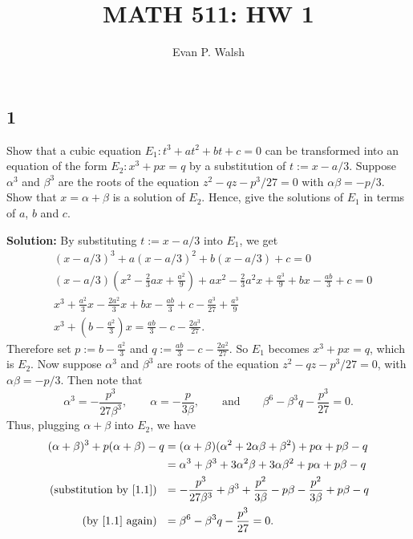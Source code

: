 \documentclass[12pt]{article}
\title{MATH 511: HW 1}
\author{Evan P. Walsh}
\begin{document}
\maketitle


\subsection*{1}
Show that a cubic equation $E_{1} : t^{3} + at^{2} + bt + c = 0$ can be transformed into an equation of the form $E_{2} : x^{3} + px = q$ by a
substitution of $t := x - a/3$. Suppose $\alpha^{3}$ and $\beta^{3}$ are the roots of the equation $z^{2} - qz - p^{3}/27 = 0$ with $\alpha\beta =
-p/3$. Show that $x = \alpha + \beta$ is a solution of $E_{2}$. Hence, give the solutions of $E_{1}$ in terms of $a$, $b$ and $c$.

{\bf Solution:} By substituting $t := x - a/3$ into $E_{1}$, we get 
\begin{align*}
& (x - a/3)^{3} + a(x-a/3)^{2} + b(x-a/3) + c = 0 \\
& (x -a/3)\left(x^{2} - \frac{2}{3}ax + \frac{a^{2}}{9}\right) + ax^{2} - \frac{2}{3}a^{2}x + \frac{a^{3}}{9} + bx - \frac{ab}{3} + c = 0 \\
& x^{3} + \frac{a^{2}}{3}x - \frac{2a^{2}}{3}x + bx - \frac{ab}{3} + c - \frac{a^{3}}{27} + \frac{a^{3}}{9} \\
& x^{3} + \left( b - \frac{a^{2}}{3} \right)x = \frac{ab}{3} - c - \frac{2a^{3}}{27}.
\end{align*}
Therefore set $p := b - \frac{a^{2}}{3}$ and $q := \frac{ab}{3} - c - \frac{2a^{2}}{27}$. So $E_{1}$ becomes $x^{3} + px = q$, which is $E_{2}$. Now
suppose $\alpha^{3}$ and $\beta^{3}$ are roots of the equation $z^{2} - qz - p^{3}/27 = 0$, with $\alpha\beta = -p/3$. Then note that 
\begin{equation}
\alpha^{3} = - \frac{p^{3}}{27\beta^{3}}, \qquad \alpha = - \frac{p}{3\beta}, \qquad \text{and} \qquad \beta^{6} - \beta^{3}q - \frac{p^{3}}{27} =
0. 
\label{1.1}
\end{equation}
Thus, plugging $\alpha + \beta$ into $E_{2}$, we have 
\begin{align*}
(\alpha + \beta)^{3} + p(\alpha + \beta) - q & = (\alpha + \beta)(\alpha^{2} + 2\alpha\beta + \beta^{2}) + p\alpha + p\beta - q \\
&= \alpha^{3} + \beta^{3} + 3\alpha^{2}\beta + 3\alpha\beta^{2} + p\alpha + p\beta - q \\
\text{(substitution by \eqref{1.1}) } \ & = -\frac{p^{3}}{27\beta^{3}} + \beta^{3} + \frac{p^{2}}{3\beta} - p\beta - \frac{p^{2}}{3\beta} + p\beta - q \\
\text{(by \eqref{1.1} again) }\ &= \beta^{6} - \beta^{3}q - \frac{p^{3}}{27} = 0.
\end{align*}
\end{document}
